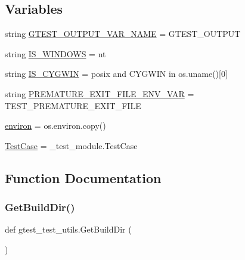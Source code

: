 \subsection*{Variables}
\begin{DoxyCompactItemize}
\item 
string \hyperlink{namespacegtest__test__utils_aeb3755b4dd33aabe1baee781fecc1e66}{G\+T\+E\+S\+T\+\_\+\+O\+U\+T\+P\+U\+T\+\_\+\+V\+A\+R\+\_\+\+N\+A\+ME} = \textquotesingle{}G\+T\+E\+S\+T\+\_\+\+O\+U\+T\+P\+UT\textquotesingle{}
\item 
string \hyperlink{namespacegtest__test__utils_a7555b17006f1c078cda336750b8613e0}{I\+S\+\_\+\+W\+I\+N\+D\+O\+WS} = \textquotesingle{}nt\textquotesingle{}
\item 
string \hyperlink{namespacegtest__test__utils_a6a936096debb3c2e807d000f76245740}{I\+S\+\_\+\+C\+Y\+G\+W\+IN} = \textquotesingle{}posix\textquotesingle{} and \textquotesingle{}C\+Y\+G\+W\+IN\textquotesingle{} in os.\+uname()\mbox{[}0\mbox{]}
\item 
string \hyperlink{namespacegtest__test__utils_aa961c38a16224b2e7fd8c93fc1d2a90f}{P\+R\+E\+M\+A\+T\+U\+R\+E\+\_\+\+E\+X\+I\+T\+\_\+\+F\+I\+L\+E\+\_\+\+E\+N\+V\+\_\+\+V\+AR} = \textquotesingle{}T\+E\+S\+T\+\_\+\+P\+R\+E\+M\+A\+T\+U\+R\+E\+\_\+\+E\+X\+I\+T\+\_\+\+F\+I\+LE\textquotesingle{}
\item 
\hyperlink{namespacegtest__test__utils_ab0f2d4a3e90400abb93fd0808047a0a4}{environ} = os.\+environ.\+copy()
\item 
\hyperlink{namespacegtest__test__utils_acb97a85206c09d233db6c7f2362e5428}{Test\+Case} = \+\_\+test\+\_\+module.\+Test\+Case
\end{DoxyCompactItemize}


\subsection{Function Documentation}
\mbox{\label{namespacegtest__test__utils_a1eacd9a471dfa6133028923ea755d22c}} 
\subsubsection{\texorpdfstring{Get\+Build\+Dir()}{GetBuildDir()}}
{\footnotesize\ttfamily def gtest\+\_\+test\+\_\+utils.\+Get\+Build\+Dir (\begin{DoxyParamCaption}{ }\end{DoxyParamCaption})}

